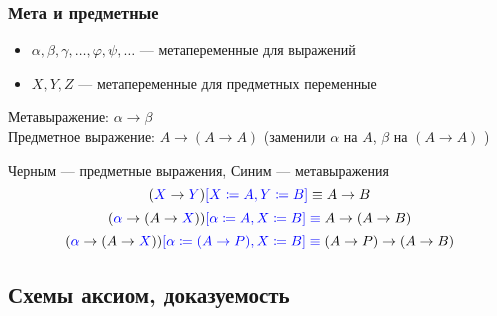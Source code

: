 \documentclass[english]{article}
\begin{document}
\subsubsection{Мета и предметные}
\label{sec:org38f6ee8}
\begin{itemize}
	\item \(\alpha, \beta, \gamma, \dots, \varphi, \psi, \dots\) --- метапеременные для выражений
	\item \(X, Y, Z\) --- метапеременные для предметных переменные
\end{itemize}
Метавыражение: \(\alpha \to \beta\) \\
Предметное выражение: \(A \to (A \to A)\) (заменили \(\alpha\) на \(A\), \(\beta\) на \((A \to A)\) )
\begin{examp}
	Черным --- предметные выражения, Синим --- метавыражения
	\[ (\color{blue}X \color{black}\to\color{blue} Y\color{black})\color{blue}[X \coloneqq A, Y \coloneqq B] \color{black} \equiv A \to B \]
	\[ (\color{blue}\alpha \color{black} \to (A \to \color{blue}X \color{black}))\color{blue}[\alpha \coloneqq A, X \coloneqq B] \equiv \color{black} A \to (A \to B) \]
	\[ (\color{blue}\alpha \color{black} \to (A \to \color{blue}X \color{black}))\color{blue}[\alpha \coloneqq (A \to P), X \coloneqq B] \equiv \color{black} (A \to P) \to (A \to B) \]
\end{examp}
\subsection{Схемы аксиом, доказуемость}
\label{sec:org08a8b75}
\end{document}
